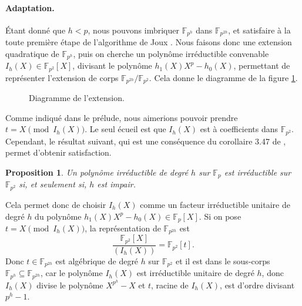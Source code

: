 \documentclass[a4paper, titlepage, 11pt]{article}
\newtheorem{prop}[theo]{Proposition}
\theoremstyle{definition}
\theoremstyle{remark}
\def\gf #1{\mathbb{F}_{#1}}
\newcommand{\extension}[2]{{#1} / {#2}} %
\begin{document}
\paragraph{Adaptation.} Étant donné que $h < p$, nous pouvons imbriquer $\gf{p^h}$ dans $\gf{p^{2h}}$, et satisfaire à la toute première étape de l'algorithme de Joux \cite{joux2013}. Nous faisons donc une extension quadratique de $\gf{p^h}$, puis on cherche un polynôme irréductible convenable $I_h(X)\in\gf{p^2}[X]$, divisant le polynôme $h_1(X)X^p - h_0(X)$, permettant de représenter l'extension de corps $\extension{\gf{p^{2h}}}{\gf{p^2}}$. Cela donne le diagramme de la figure \ref{fig:diag}.
\begin{figure}[h]
\begin{center}
\label{fig:diag}
\caption{Diagramme de l'extension.}
\end{center}
\end{figure}

Comme indiqué dans le prélude, nous aimerions pouvoir prendre $t = X \pmod{I_h(X)}$. Le seul écueil est que $I_h(X)$ est à coefficients dans $\gf{p^2}$. Cependant, le résultat suivant, qui est une conséquence du corollaire 3.47 de \cite{niederreiter1986}, permet d'obtenir satisfaction.
\begin{prop}
Un polynôme irréductible de degré $h$ sur $\gf{p}$ est irréductible sur $\gf{p^2}$ si, et seulement si, $h$ est impair.
\end{prop}
Cela permet donc de choisir $I_h(X)$ comme un facteur irréductible unitaire de degré $h$ du polynôme $h_1(X)X^p-h_0(X) \in \gf{p}[X]$. Si on pose $t = X \pmod{I_h(X)}$, la représentation de $\gf{p^{2h}}$ est $$\frac{\gf{p^2}[X]}{(I_h(X))} = \gf{p^2}[t].$$
Donc $t \in \gf{p^{2h}}$ est algébrique de degré $h$ sur $\gf{p^2}$ et il est dans le sous-corps $\gf{p^h} \subseteq \gf{p^{2h}}$, car le polynôme $I_h(X)$ est irréductible unitaire de degré $h$, donc $I_h(X)$ divise le polynôme $X^{p^h} - X$ et $t$, racine de $I_h(X)$, est d'ordre divisant $p^h-1$.
\end{document}
